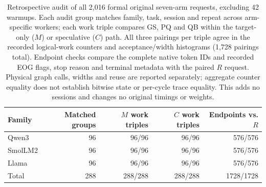 \begin{table}[t]
\centering
\small
\begin{tabular}{lrrrr}
\toprule
Family & Matched groups & $M$ work triples & $C$ work triples & Endpoints vs. $R$ \\
\midrule
Qwen3 & 96 & 96/96 & 96/96 & 576/576 \\
SmolLM2 & 96 & 96/96 & 96/96 & 576/576 \\
Llama & 96 & 96/96 & 96/96 & 576/576 \\
\midrule
Total & 288 & 288/288 & 288/288 & 1728/1728 \\
\bottomrule
\end{tabular}
\caption{Retrospective audit of all 2,016 formal original seven-arm requests, excluding 42 warmups. Each audit group matches family, task, session and repeat across arm-specific workers; each work triple compares GS, PQ and QB within the target-only ($M$) or speculative ($C$) path. All three pairings per triple agree in the recorded logical-work counters and acceptance/width histograms (1,728 pairings total). Endpoint checks compare the complete native token IDs and recorded EOG flags, stop reason and terminal metadata with the paired $R$ request. Physical graph calls, widths and reuse are reported separately; aggregate counter equality does not establish bitwise state or per-cycle trace equality. This adds no sessions and changes no original timings or weights.}
\label{tab:sevenarmwork}
\end{table}
